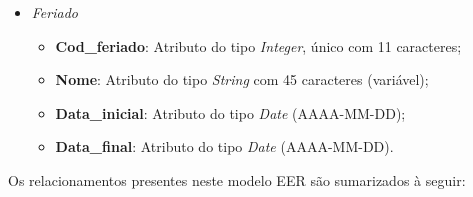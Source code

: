 \documentclass[a4paper, 12pt]{article}
\begin{document}
\begin{itemize}
    \item \emph{\large Feriado}
    \begin{itemize}
        \item \textbf{Cod\_feriado}: Atributo do tipo \emph{Integer}, único com 11 caracteres;
        \item \textbf{Nome}: Atributo do tipo \emph{String} com 45 caracteres (variável);
        \item \textbf{Data\_inicial}: Atributo do tipo \emph{Date} (AAAA-MM-DD);
        \item \textbf{Data\_final}: Atributo do tipo \emph{Date} (AAAA-MM-DD).
    \end{itemize}

\end{itemize}

\noindent Os relacionamentos presentes neste modelo EER são sumarizados à seguir:
\end{document}
